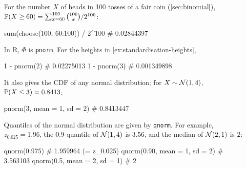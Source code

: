 \begin{example}\label{ex:r-binomial-tail}
For the number $X$ of heads in 100 tosses of a fair coin (\cref{sec:binomial}), $\mathbb{P}(X \ge 60) = \sum_{x=60}^{100} \binom{100}{x} / 2^{100}$:
\begin{rcode}
sum(choose(100, 60:100)) / 2^100    # 0.02844397
\end{rcode}
\end{example}

\begin{example}\label{ex:r-pnorm}
In R, $\Phi$ is \texttt{pnorm}. For the heights in \cref{ex:standardisation-heights},
\begin{rcode}
1 - pnorm(2)    # 0.02275013
1 - pnorm(3)    # 0.001349898
\end{rcode}
It also gives the CDF of any normal distribution; for $X \sim \mathcal{N}(1, 4)$, $\mathbb{P}(X \le 3) = 0.8413$:
\begin{rcode}
pnorm(3, mean = 1, sd = 2)      # 0.8413447
\end{rcode}
\end{example}

\begin{example}\label{ex:r-qnorm}
Quantiles of the normal distribution are given by \texttt{qnorm}. For example, $z_{0.025} = 1.96$, the $0.9$-quantile of $\mathcal{N}(1, 4)$ is $3.56$, and the median of $\mathcal{N}(2, 1)$ is $2$:
\begin{rcode}
qnorm(0.975)                    # 1.959964  (= z_0.025)
qnorm(0.90, mean = 1, sd = 2)   # 3.563103
qnorm(0.5, mean = 2, sd = 1)    # 2
\end{rcode}
\end{example}

